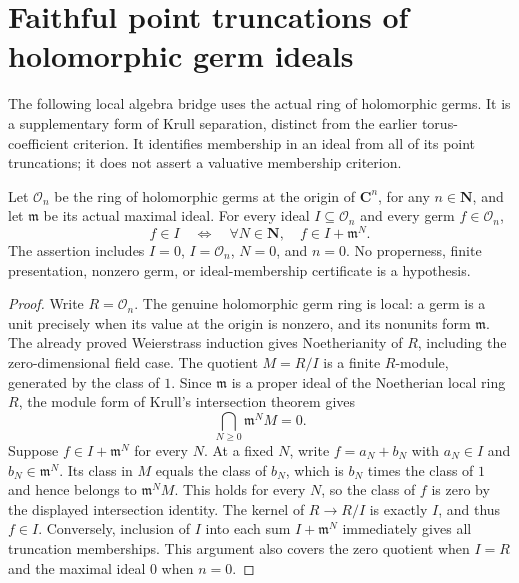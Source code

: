 \section{Faithful point truncations of holomorphic germ ideals}

The following local algebra bridge uses the actual ring of holomorphic germs.
It is a supplementary form of Krull separation, distinct from the earlier
torus-coefficient criterion. It identifies membership in an ideal from all
of its point truncations; it does not assert a valuative membership criterion.

\begin{theorem}
\label{trace:actual-holomorphic-germ-point-truncation-closure}
\leanok
Let $\mathcal O_n$ be the ring of holomorphic germs at the origin of
$\mathbf C^n$, for any $n\in\mathbf N$, and let $\mathfrak m$ be its actual
maximal ideal. For every ideal $I\subseteq\mathcal O_n$ and every germ
$f\in\mathcal O_n$,
\[
 f\in I\quad\Longleftrightarrow\quad
 \forall N\in\mathbf N,\quad f\in I+\mathfrak m^N.
\]
The assertion includes $I=0$, $I=\mathcal O_n$, $N=0$, and $n=0$.
No properness, finite presentation, nonzero germ, or ideal-membership
certificate is a hypothesis.
\end{theorem}
\begin{proof}
Write $R=\mathcal O_n$. The genuine holomorphic germ ring is local:
a germ is a unit precisely when its value at the origin is nonzero, and
its nonunits form $\mathfrak m$. The already proved Weierstrass induction
gives Noetherianity of $R$, including the zero-dimensional field case.
The quotient $M=R/I$ is a finite $R$-module, generated by the class of $1$.
Since $\mathfrak m$ is a proper ideal of the Noetherian local ring $R$,
the module form of Krull's intersection theorem gives
\[
 \bigcap_{N\geq0}\mathfrak m^N M=0.
\]
Suppose $f\in I+\mathfrak m^N$ for every $N$. At a fixed $N$, write
$f=a_N+b_N$ with $a_N\in I$ and $b_N\in\mathfrak m^N$. Its class in $M$
equals the class of $b_N$, which is $b_N$ times the class of $1$ and hence
belongs to $\mathfrak m^N M$. This holds for every $N$, so the class of
$f$ is zero by the displayed intersection identity. The kernel of
$R\to R/I$ is exactly $I$, and thus $f\in I$.
Conversely, inclusion of $I$ into each sum $I+\mathfrak m^N$ immediately
gives all truncation memberships. This argument also covers the zero
quotient when $I=R$ and the maximal ideal $0$ when $n=0$.
\end{proof}
